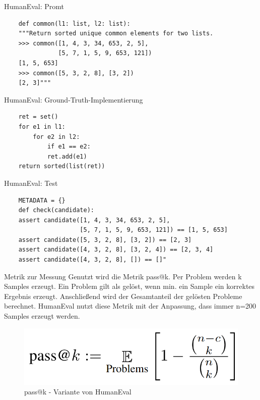 \documentclass{beamer}              %
\begin{document}
\begin{frame}[fragile]{HumanEval: Promt}
    \begin{lstlisting}
    def common(l1: list, l2: list):
    """Return sorted unique common elements for two lists.
    >>> common([1, 4, 3, 34, 653, 2, 5],
               [5, 7, 1, 5, 9, 653, 121])
    [1, 5, 653]
    >>> common([5, 3, 2, 8], [3, 2])
    [2, 3]"""
    \end{lstlisting}
\end{frame}
\begin{frame}[fragile]{HumanEval: Ground-Truth-Implementierung}
  \begin{lstlisting}
    ret = set()
    for e1 in l1:
        for e2 in l2:
            if e1 == e2:
            ret.add(e1)
    return sorted(list(ret))
   \end{lstlisting}
\end{frame}
\begin{frame}[fragile]{HumanEval: Test}
    \begin{lstlisting}
    METADATA = {}
    def check(candidate):
    assert candidate([1, 4, 3, 34, 653, 2, 5],
                     [5, 7, 1, 5, 9, 653, 121]) == [1, 5, 653]
    assert candidate([5, 3, 2, 8], [3, 2]) == [2, 3]
    assert candidate([4, 3, 2, 8], [3, 2, 4]) == [2, 3, 4]
    assert candidate([4, 3, 2, 8], []) == []"
    \end{lstlisting}
\end{frame}

\begin{frame}{Metrik zur Messung}
Genutzt wird die Metrik pass@k. Per Problem werden k Samples erzeugt. Ein Problem gilt als gelöst, wenn min. ein Sample ein korrektes Ergebnis erzeugt. Anschließend wird der Gesamtanteil der gelösten Probleme berechnet. HumanEval nutzt diese Metrik mit der Anpassung, dass immer n=200 Samples erzeugt werden.
    \begin{figure}
        \centering
        \includegraphics[width=0.6\paperwidth]{images/passk.png}
        \caption{pass@k - Variante von HumanEval\cite{chen2021evaluating}}
    \end{figure}
\end{frame}
\end{document}
